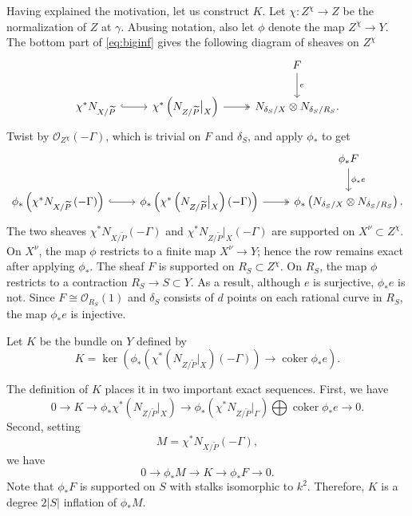 \documentclass[11 pt]{amsart}
\renewcommand{\k}{k}
\renewcommand{\O}{{\mathcal O}}
\providecommand {\from}{{\colon}}
\providecommand{\coker}{\operatorname{coker}}
\numberwithin{equation}{section}
\begin{document}
Having explained the motivation, let us construct $K$.
Let $\chi \from Z^\chi \to Z$ be the normalization of $Z$ at $\gamma$.
Abusing notation, also let $\phi$ denote the map $Z^\chi \to Y$.
The bottom part of \eqref{eq:biginf} gives the following diagram of sheaves on $Z^\chi$
\begin{equation}\label{eq:prepreK}
  \begin{tikzcd}
    {} & {} & F\arrow{d}{e} \\
    \chi^* N_{X/\widetilde{P}} \arrow[hookrightarrow]{r}& \chi^* \left(N_{Z/\widetilde{P}}\big|_X\right) \arrow[two heads]{r}& N_{\delta_S/X} \otimes N_{\delta_S/R_S}. 
  \end{tikzcd}
\end{equation}
Twist by $\O_{Z^\chi}(-\Gamma)$, which is trivial on $F$ and $\delta_S$, and apply $\phi_*$ to get
\begin{equation}\label{eq:preK}
  \begin{tikzcd}
    {} & {} &{\phi}_*F \arrow{d}{\phi_* e}\\
    {\phi}_*\left(\chi^* N_{X/\widetilde{P}}\left(-\Gamma\right)\right) \arrow[hookrightarrow]{r}& \phi_*\left(\chi^* \left( N_{Z/\widetilde{P}}\big|_X\right) \left(-\Gamma\right)\right) \arrow[two heads]{r}& \phi_*\left(N_{\delta_S/X} \otimes N_{\delta_S/R_S}\right).
  \end{tikzcd}
\end{equation}
The two sheaves $\chi^*N_{X/\widetilde{P}}(-\Gamma)$ and $\chi^* N_{Z/\widetilde{P}}|_X (-\Gamma)$ are supported on $X^\nu \subset Z^\chi$.
On $X^\nu$, the map $\phi$ restricts to a finite map $X^\nu \to Y$; hence the row remains exact after applying $\phi_*$.
The sheaf $F$ is supported on $R_S \subset Z^\chi$.
On $R_S$, the map $\phi$ restricts to a contraction $R_S \to S \subset Y$.
As a result, although $e$ is surjective, $\phi_*e$ is not.
Since $F \cong \O_{R_S}(1)$ and $\delta_S$ consists of $d$ points on each rational curve in $R_S$, the map $\phi_* e$ is injective.

Let $K$ be the bundle on $Y$ defined by
\begin{equation}\label{eq:defK}
  K = \ker \left(\phi_*\left(\chi^* \left(N_{Z/\widetilde{P}}\big|_X\right)\left(-\Gamma\right)\right) \to \coker \phi_*e\right).
\end{equation}

The definition of $K$ places it in two important exact sequences.
First, we have 
\begin{equation}\label{eq:defK2}
  0 \to K \to \phi_* \chi^* \left(N_{Z/\widetilde{P}}\big|_X\right) \to \phi_*\left(\chi^* N_{Z/\widetilde{P}} \big|_\Gamma\right) \bigoplus \coker \phi_*e \to 0.
\end{equation}
Second, setting 
\[ M = \chi^* N_{X/\widetilde{P}}\left(-\Gamma\right),\]
we have 
\begin{equation}\label{eq:Kinf}
  0 \to \phi_*M \to K \to \phi_* F \to 0.
\end{equation}
Note that $\phi_* F$ is supported on $S$ with stalks isomorphic to $\k^2$.
Therefore, $K$ is a degree $2|S|$ inflation of $\phi_*M$.
\end{document}
